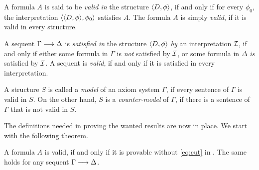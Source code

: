 \documentclass[11pt,a4paper]{article}
\begin{document}
\begin{definition}\label{def:valid formula}
    A formula \(A\) is said to be \emph{valid in} the structure \(\langle D,\phi\rangle\),
    if and only if for every \(\phi_0\),
    the interpretation \(\langle\langle D,\phi\rangle,\phi_0\rangle\)
    satisfies \(A\). The formula \(A\) is simply \emph{valid}, if
    it is valid in every structure.
\end{definition}

\begin{definition}%
\label{def:satisfied and valid sequents}
A sequent \(\Gamma\longrightarrow\Delta\) is \emph{satisfied in} the structure
\(\langle D,\phi\rangle\) \emph{by} an interpretation \(\mathcal{I}\),
if and only if either some formula in \(\Gamma\) is \emph{not}
satisfied by \(\mathcal{I}\), or some formula in \(\Delta\) \emph{is}
satisfied by \(\mathcal{I}\). A sequent is \emph{valid}, if and only if
it is satisfied in every interpretation.
\end{definition}

\begin{definition}%
\label{def:model and counter-model}
A structure \(S\) is called a \emph{model} of an axiom system
\(\Gamma\), if every sentence of \(\Gamma\) is valid in \(S\).
On the other hand, \(S\) is a \emph{counter-model} of \(\Gamma\),
if there is a sentence of \(\Gamma\) that is not valid in \(S\).
\end{definition}

The definitions needed in proving the wanted results
are now in place. We start with the following theorem.

\begin{theorem}\label{the:8.2}
    A formula \(A\) is valid,
    if and only if it is provable without \eqref{eq:cut} in \LK.
    The same holds for any sequent \(\Gamma\longrightarrow\Delta\).
\end{theorem}
\end{document}
